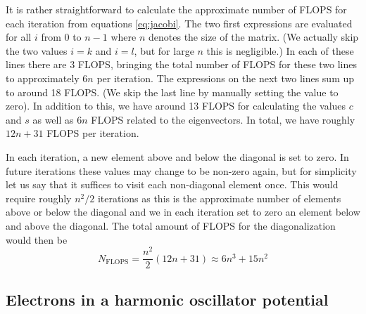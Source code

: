 \documentclass[reprint,english,notitlepage,nofootinbib]{revtex4-1}  %
\begin{document}
It is rather straightforward to calculate the approximate number of FLOPS for each iteration from equations \ref{eq:jacobi}. The two first expressions are evaluated for all $i$ from 0 to $n-1$ where $n$ denotes the size of the matrix. (We actually skip the two values $i = k$ and $i = l$, but for large $n$ this is negligible.) In each of these lines there are 3 FLOPS, bringing the total number of FLOPS for these two lines to approximately $6 n$ per iteration. The expressions on the next two lines sum up to around 18 FLOPS. (We skip the last line by manually setting the value to zero). In addition to this, we have around 13 FLOPS for calculating the values $c$ and $s$ as well as $6 n$ FLOPS related to the eigenvectors. In total, we have roughly $12 n + 31$ FLOPS per iteration.

In each iteration, a new element above and below the diagonal is set to zero. In future iterations these values may change to be non-zero again, but for simplicity let us say that it suffices to visit each non-diagonal element once. This would require roughly $n^2/2$ iterations as this is the approximate number of elements above or below the diagonal and we in each iteration set to zero an element below and above the diagonal. The total amount of FLOPS for the diagonalization would then be
\begin{equation*}
  N_{\text{FLOPS}} = \frac{n^2}{2} (12 n + 31) \approx 6 n^3 + 15 n^2
\end{equation*}


\subsection{Electrons in a harmonic oscillator potential}
\end{document}
